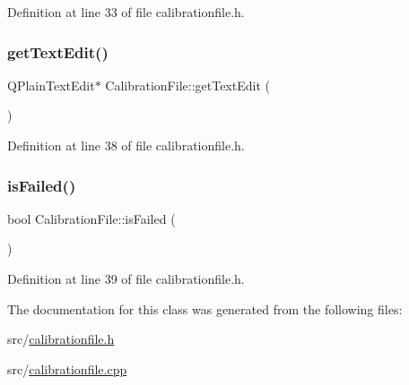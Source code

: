 Definition at line 33 of file calibrationfile.\+h.

\mbox{\label{class_calibration_file_aa49c09c9493c85e00cebc47da8f56789}} 
\subsubsection{\texorpdfstring{getTextEdit()}{getTextEdit()}}
{\footnotesize\ttfamily Q\+Plain\+Text\+Edit$\ast$ Calibration\+File\+::get\+Text\+Edit (\begin{DoxyParamCaption}{ }\end{DoxyParamCaption})\hspace{0.3cm}{\ttfamily [inline]}}



Definition at line 38 of file calibrationfile.\+h.

\mbox{\label{class_calibration_file_a68687a65fa7be1763c6f22ed6142faad}} 
\subsubsection{\texorpdfstring{isFailed()}{isFailed()}}
{\footnotesize\ttfamily bool Calibration\+File\+::is\+Failed (\begin{DoxyParamCaption}{ }\end{DoxyParamCaption})\hspace{0.3cm}{\ttfamily [inline]}}



Definition at line 39 of file calibrationfile.\+h.



The documentation for this class was generated from the following files\+:\begin{DoxyCompactItemize}
\item 
src/\mbox{\hyperlink{calibrationfile_8h}{calibrationfile.\+h}}\item 
src/\mbox{\hyperlink{calibrationfile_8cpp}{calibrationfile.\+cpp}}\end{DoxyCompactItemize}

